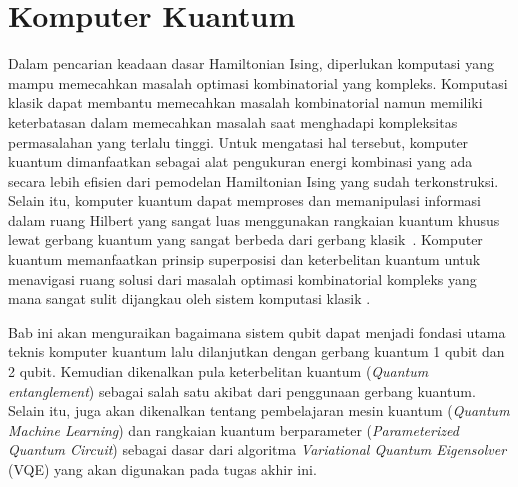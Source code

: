\section{Komputer Kuantum}
Dalam pencarian keadaan dasar Hamiltonian Ising, diperlukan komputasi yang mampu memecahkan masalah optimasi kombinatorial yang kompleks. Komputasi klasik dapat membantu memecahkan masalah kombinatorial namun memiliki keterbatasan dalam memecahkan masalah saat menghadapi kompleksitas permasalahan yang terlalu tinggi. Untuk mengatasi hal tersebut, komputer kuantum dimanfaatkan sebagai alat pengukuran energi kombinasi yang ada secara lebih efisien dari pemodelan Hamiltonian Ising yang sudah terkonstruksi. Selain itu, komputer kuantum dapat memproses dan memanipulasi informasi dalam ruang Hilbert yang sangat luas menggunakan rangkaian kuantum khusus lewat gerbang kuantum yang sangat berbeda dari gerbang klasik~. Komputer kuantum memanfaatkan prinsip superposisi dan keterbelitan kuantum untuk menavigasi ruang solusi dari masalah optimasi kombinatorial kompleks yang mana sangat sulit dijangkau oleh sistem komputasi klasik \cite{preskill_quantum_2018}.

Bab ini akan menguraikan bagaimana sistem qubit dapat menjadi fondasi utama teknis komputer kuantum lalu dilanjutkan dengan gerbang kuantum 1 qubit dan 2 qubit. Kemudian dikenalkan pula keterbelitan kuantum (\textit{Quantum entanglement}) sebagai salah satu akibat dari penggunaan gerbang kuantum. Selain itu, juga akan dikenalkan tentang pembelajaran mesin kuantum (\textit{Quantum Machine Learning}) dan rangkaian kuantum berparameter (\textit{Parameterized Quantum Circuit}) sebagai dasar dari algoritma \textit{Variational Quantum Eigensolver} (VQE) yang akan digunakan pada tugas akhir ini.

